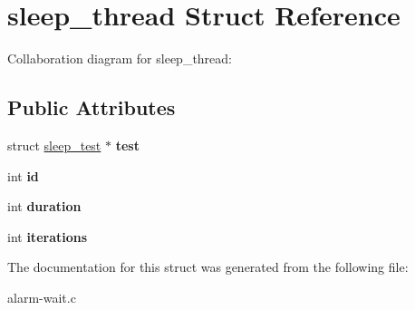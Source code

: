 \hypertarget{structsleep__thread}{}\section{sleep\+\_\+thread Struct Reference}
\label{structsleep__thread}


Collaboration diagram for sleep\+\_\+thread\+:
\subsection*{Public Attributes}
\begin{DoxyCompactItemize}
\item 
struct \hyperlink{structsleep__test}{sleep\+\_\+test} $\ast$ {\bfseries test}\hypertarget{structsleep__thread_add4bdbe99cbbecdc9ecd514d2261d4a7}{}\label{structsleep__thread_add4bdbe99cbbecdc9ecd514d2261d4a7}

\item 
int {\bfseries id}\hypertarget{structsleep__thread_a317fb8a94e5339f25a495c352709b1f7}{}\label{structsleep__thread_a317fb8a94e5339f25a495c352709b1f7}

\item 
int {\bfseries duration}\hypertarget{structsleep__thread_a6815eafbbfb280722503f8241e1f2dfe}{}\label{structsleep__thread_a6815eafbbfb280722503f8241e1f2dfe}

\item 
int {\bfseries iterations}\hypertarget{structsleep__thread_a54090276cae664c5682e79f79327aef8}{}\label{structsleep__thread_a54090276cae664c5682e79f79327aef8}

\end{DoxyCompactItemize}


The documentation for this struct was generated from the following file\+:\begin{DoxyCompactItemize}
\item 
alarm-\/wait.\+c\end{DoxyCompactItemize}
